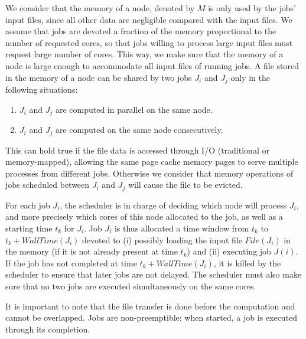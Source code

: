 \documentclass[conference,10pt]{IEEEtran}
\newcommand{\Node}[1]{\ensuremath{\mathrm{Node}_{#1}}\xspace}
\newcommand{\file}{\ensuremath{\mathit{File}}\xspace}
\newcommand{\storage}{\ensuremath{\mathit{Storage}}\xspace}
\newcommand{\size}{\ensuremath{\mathit{Size}}\xspace}
\newcommand{\memory}{\ensuremath{\mathit{M}}\xspace}
\newcommand{\walltime}{\mathit{WallTime}\xspace}
\begin{document}
We consider that the memory of a node, denoted by
$\memory$ is only used by the jobs' input files, since all other data are
negligible compared with the input files. We assume that jobs are
devoted a fraction of the memory proportional to the number of
requested cores, so that jobs willing to process large input files
must request large number of cores. This way, we make sure that the
memory of a node is large enough to accommodate all input files of running jobs.
A file stored in the memory of a node can be shared by two jobs $J_i$ and $J_j$ only in the following situations:
\begin{enumerate}
	\item $J_i$ and $J_j$ are computed in parallel on the same node.
	\item $J_i$ and $J_j$ are computed on the same node consecutively.
\end{enumerate}
This can hold true if the file data is accessed through I/O (traditional or memory-mapped),
allowing the same page cache memory pages to serve multiple processes from different jobs.
Otherwise we consider that memory operations of jobs scheduled between
$J_i$ and $J_j$ will cause the file to be evicted.


For each job $J_i$, the scheduler is in charge of deciding which node
will process $J_i$, and more precisely which cores of this node
allocated to the job, as well as a starting time $t_k$ for $J_i$. Job
$J_i$ is thus allocated a time window from $t_k$ to
$t_k+\walltime(J_i)$ devoted to (i) possibly loading the input file
$\file(J_i)$ in the memory (if it is not already present at time
$t_k$) and (ii) executing job $J(i)$. If the job has not completed at
time $t_k+\walltime(J_i)$, it is killed by the scheduler to ensure
that later jobs are not delayed.  The scheduler must also make sure
that no two jobs are executed simultaneously on the same cores.

It is important to note that the file transfer is done before the computation and cannot be overlapped.
Jobs are non-preemptible: when started, a job is executed through its completion.
\end{document}
